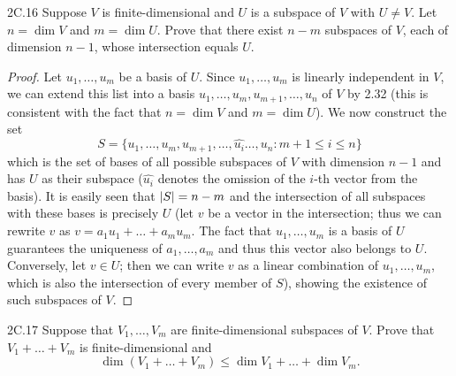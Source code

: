 \documentclass{exam}
\begin{document}
\begin{problem}{2C.16}
    Suppose $V$ is finite-dimensional and $U$ is a subspace of $V$ with $U\neq V$. Let $n=\dim V$ and $m=\dim U$. Prove that there exist $n - m$ subspaces of $V$, each of dimension $n - 1$, whose intersection equals $U$.
\end{problem}

\begin{proof}
    Let $u_1, \dots, u_m$ be a basis of $U$. Since $u_1, \dots, u_m$ is linearly independent in $V$, we can extend this list into a basis $u_1, \dots, u_m, u_{m + 1}, \dots, u_n$ of $V$ by 2.32 (this is consistent with the fact that $n = \dim V$ and $m = \dim U$). We now construct the set \[
        S = \{u_1, \dots, u_m, u_{m + 1}, \dots, \hat{u_i}\dots, u_n : m + 1 \le i \le n\}
    \]
    which is the set of bases of all possible subspaces of $V$ with dimension $n - 1$ and has $U$ as their subspace ($\hat{u_i}$ denotes the omission of the $i$-th vector from the basis). It is easily seen that $\abs{S} = n - m$ and the intersection of all subspaces with these bases is precisely $U$ (let $v$ be a vector in the intersection; thus we can rewrite $v$ as $v = a_1u_1 + \dots + a_mu_m$. The fact that $u_1, \dots, u_m$ is a basis of $U$ guarantees the uniqueness of $a_1, \dots, a_m$ and thus this vector also belongs to $U$. Conversely, let $v\in U$; then we can write $v$ as a linear combination of $u_1, \dots, u_m$, which is also the intersection of every member of $S$), showing the existence of such subspaces of $V$.
\end{proof}

\begin{problem}{2C.17}
    Suppose that $V_1, \dots, V_m$ are finite-dimensional subspaces of $V$. Prove that $V_1 + \dots + V_m$ is finite-dimensional and \[
        \dim(V_1 + \dots + V_m)\le\dim V_1 + \dots +\dim V_m.
    \]
\end{problem}
\end{document}
